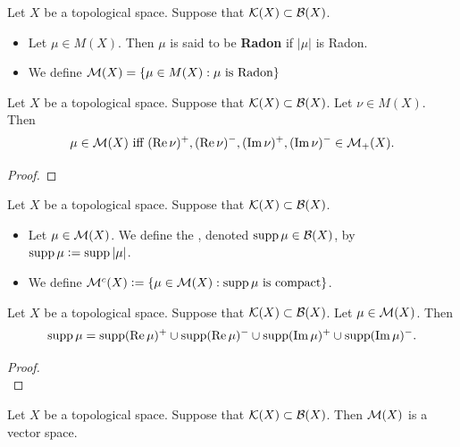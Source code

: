 \documentclass{book}
\begin{document}
	\begin{defn} 
		Let $X$ be a topological space. Suppose that $\mathcal{K}(X) \subset \mathcal{B}(X)$.
		\begin{itemize}
			\item Let $\mu \in M(X)$. Then $\mu$ is said to be \textbf{Radon} if $|\mu|$ is Radon.
			\item We define $\mathcal{M}(X) = \{\mu \in M(X): \text{$\mu$ is Radon}\}$
		\end{itemize}
	\end{defn}
	
	\begin{ex} 
		Let $X$ be a topological space. Suppose that $\mathcal{K}(X) \subset \mathcal{B}(X)$. Let $\nu \in M(X)$. Then 
		$$\text{$\mu \in \mathcal{M}(X)$ iff $(\text{Re} \, \nu)^+, (\text{Re} \, \nu)^-, (\text{Im} \, \nu)^+, (\text{Im} \, \nu)^- \in \mathcal{M}_+(X)$.}$$
	\end{ex}

	\begin{proof} 
	\end{proof}
	
	\begin{defn} 
		Let $X$ be a topological space. Suppose that $\mathcal{K}(X) \subset \mathcal{B}(X)$.
		\begin{itemize}
			\item Let $\mu \in \mathcal{M}(X)$. We define the , denoted $\operatorname{supp} \mu \in \mathcal{B}(X)$, by $\operatorname{supp} \mu \vcentcolon= \operatorname{supp} |\mu|$. 
			\item We define $\mathcal{M}^c(X) \vcentcolon= \{\mu \in \mathcal{M}(X): \text{$\operatorname{supp} \mu$ is compact}\}$.
		\end{itemize}
	\end{defn}
	
	\begin{ex} 
		Let $X$ be a topological space. Suppose that $\mathcal{K}(X) \subset \mathcal{B}(X)$. Let $\mu \in \mathcal{M}(X)$. Then 
		$$\operatorname{supp} \mu = \operatorname{supp} (\text{Re} \, \mu)^+ \cup \operatorname{supp} (\text{Re} \, \mu)^- \cup \operatorname{supp} (\text{Im} \, \mu)^+ \cup \operatorname{supp} (\text{Im} \, \mu)^-.$$
	\end{ex}
	
	\begin{proof}
		 \\
	\end{proof}

	\begin{ex} 
		Let $X$ be a topological space. Suppose that $\mathcal{K}(X) \subset \mathcal{B}(X)$. Then $\mathcal{M}(X)$ is a vector space. 
	\end{ex}
	
\end{document}
